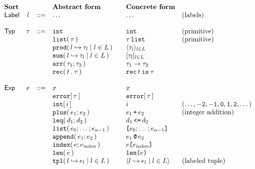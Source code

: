 \documentclass[11pt]{article}
\begin{document}
\[
\begin{array}{l c c l@{\qquad} l l}
\text{\bf Sort} &      &     & \text{\bf Abstract form}   & \text{\bf Concrete form} & \\
\Sort{Label}    & l    & ::= & \dots                      & \dots                    & (\text{labels}) \\
                &      &     &                            & \\
\TypeSort       & \tau & ::= & \inttyabt                  & \inttycst                & (\text{primitive}) \\
                &      &     & \listtyabt{\tau}           & \listtycst{\tau}         & (\text{primitive}) \\
                &      &     & \genprodabt{L}{l}{\tau_l}  & \genprodcst{L}{l}{\tau_l} \\
                &      &     & \gensumabt{L}{l}{\tau_l}   & \gensumcst{L}{l}{\tau_l} \\
                &      &     & \arrtyabt{\tau_1}{\tau_2}  & \arrtycst{\tau_1}{\tau_2} \\
                &      &     & \rectyabt{t}{\tau}         & \rectycst{t}{\tau} \\
                &      &     &                            & \\
\ExprSort       & e    & ::= & x                          & x \\
                &      &     & \errorexabt{\tau}          & \errorexcst{\tau} \\
                &      &     & \intexabt{i}               & \intexcst{i}             & (\dots, \kw{-2}, \kw{-1}, \kw{0}, \kw{1}, \kw{2}, \dots) \\
                &      &     & \plusexabt{e_1}{e_2}       & \plusexcst{e_1}{e_2}     & (\text{integer addition}) \\
                &      &     & \leqexabt{d_1}{d_2}        & \leqexcst{d_1}{d_2} \\
                &      &     & \listexabt{\ZeqABT{n-1}{e}}& \listexcst{\ZeqABT{n-1}{e}} \\
                &      &     & \appendexabt{e_1}{e_2}     & \appendexcst{e_1}{e_2} \\
                &      &     & \indexexabt{e}{e_\text{index}} & \indexexcst{e}{e_\text{index}} \\
                &      &     & \lenexabt{e}               & \lenexcst{e} \\
                &      &     & \gentupleabt{L}{l}{e_l}    & \gentuplecst{L}{l}{e_l}  & (\text{labeled tuple}) \\

\end{array}\]
\end{document}

